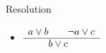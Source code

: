 \begin{frame}{Resolution}
  \bigskip
  \begin{itemize}
  \item []
    \(
    \begin{array}{c@{}@{}c@{}@{}c}
      a\vee b&&\neg a\vee c\\\hline&b\vee c&
    \end{array}
  \)
  \end{itemize}

\end{frame}
%
